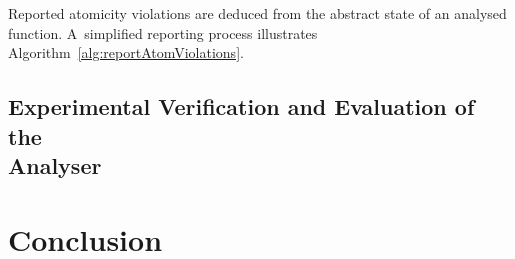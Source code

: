 Reported atomicity violations are deduced from the abstract state of
an analysed function. A~simplified reporting process illustrates
Algorithm~\ref{alg:reportAtomViolations}.

\begin{algorithm}[hbt]



    \caption{%
        Reporting of atomicity violations from the abstract state of
        an analysed function
    }
    \label{alg:reportAtomViolations}
\end{algorithm}


\section[%
    Experimental Verification and Evaluation of the Analyser
]{\texorpdfstring{%
    Experimental Verification and Evaluation of the \\ Analyser
}{}}
\label{sec:exp}




\chapter{Conclusion}
\label{chap:conc}



